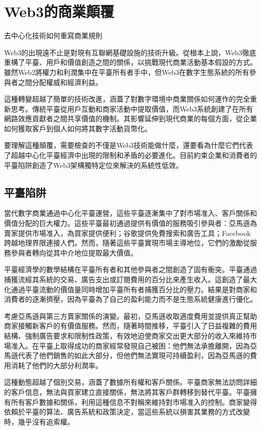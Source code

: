 \documentclass[
  Letterpaper,
]{scrbook}
\begin{document}
\chapter{Web3的商業顛覆}\label{sec-web3-disruption}

去中心化技術如何重寫商業規則

Web3的出現遠不止是對現有互聯網基礎設施的技術升級。從根本上說，Web3徹底重構了平臺、用戶和價值創造之間的關係，以挑戰現代商業活動基本假設的方式。雖然Web2將權力和利潤集中在平臺所有者手中，但Web3在數字生態系統的所有參與者之間分配權威和經濟利益。

這種轉變超越了簡單的技術改進，涵蓋了對數字環境中商業關係如何運作的完全重新思考。傳統平臺從用戶互動和商家活動中提取價值，而Web3系統創建了在所有網路效應貢獻者之間共享價值的機制。其影響延伸到現代商業的每個方面，從企業如何獲取客戶到個人如何將其數字活動貨幣化。

要理解這種顛覆，需要檢查的不僅是Web3技術能做什麼，還要看為什麼它們代表了超越中心化平臺經濟中出現的限制和矛盾的必要進化。目前約束企業和消費者的平臺陷阱創造了Web3架構獨特定位來解決的系統性低效。

\section{平臺陷阱}\label{ux5e73ux81faux9677ux9631}

當代數字商業通過中心化平臺運營，這些平臺逐漸集中了對市場准入、客戶關係和價值分配的巨大權力。這些平臺最初通過提供有價值的服務吸引參與者：亞馬遜為賣家提供市場准入，為買家提供便利；谷歌提供免費搜索和廣告工具；Facebook跨越地理界限連接人們。然而，隨著這些平臺實現市場主導地位，它們的激勵從服務參與者轉向從其中介地位提取最大價值。

平臺經濟學的數學結構在平臺所有者和其他參與者之間創造了固有衝突。平臺通過捕獲流經其系統的交易、廣告支出或訂閱費用的百分比來產生收入。這創造了最大化通過平臺流動的價值量同時增加平臺所有者捕獲百分比的壓力。結果是對商家和消費者的逐漸擠壓，因為平臺為了自己的盈利能力而不是生態系統健康進行優化。

考慮亞馬遜與第三方賣家關係的演變。最初，亞馬遜收取適度費用並提供真正幫助商家接觸新客戶的有價值服務。然而，隨著時間推移，平臺引入了日益複雜的費用結構、強制廣告要求和限制性政策，有效地迫使商家交出更大部分的收入來維持市場准入。在平臺上取得成功的商家經常發現自己被困：他們無法承擔離開，因為亞馬遜代表了他們銷售的如此大部分，但他們無法實現可持續盈利，因為亞馬遜的費用消耗了他們的大部分利潤率。

這種動態超越了個別交易，涵蓋了數據所有權和客戶關係。平臺商家無法訪問詳細的客戶信息，無法與買家建立直接關係，無法將其客戶群轉移到替代平臺。平臺擁有所有客戶數據和關係，利用這種信息不對稱來維持對市場准入的控制。商家變得依賴於平臺的算法、廣告系統和政策決定，當這些系統以損害其業務的方式改變時，幾乎沒有追索權。
\end{document}
